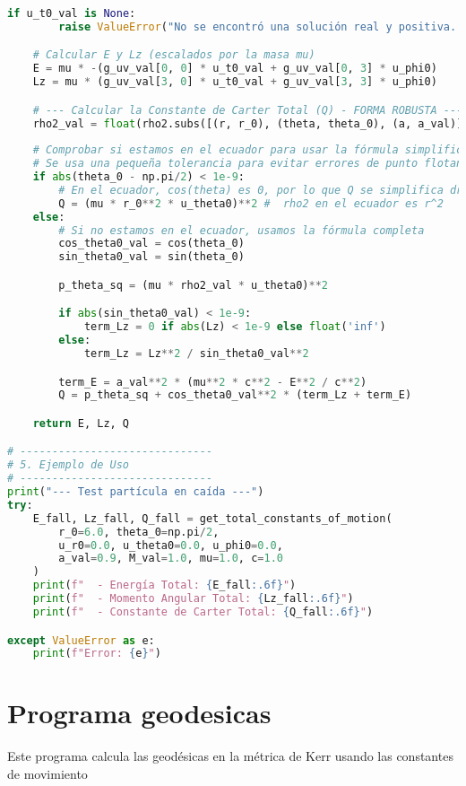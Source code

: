 \begin{lstlisting}[language=Python, caption={Programa para el calculo de las constantes de movimiento en Kerr}]
    if u_t0_val is None:
        raise ValueError("No se encontró una solución real y positiva. Revisa las condiciones iniciales.")

    # Calcular E y Lz (escalados por la masa mu)
    E = mu * -(g_uv_val[0, 0] * u_t0_val + g_uv_val[0, 3] * u_phi0)
    Lz = mu * (g_uv_val[3, 0] * u_t0_val + g_uv_val[3, 3] * u_phi0)

    # --- Calcular la Constante de Carter Total (Q) - FORMA ROBUSTA ---
    rho2_val = float(rho2.subs([(r, r_0), (theta, theta_0), (a, a_val)]))
    
    # Comprobar si estamos en el ecuador para usar la fórmula simplificada
    # Se usa una pequeña tolerancia para evitar errores de punto flotante
    if abs(theta_0 - np.pi/2) < 1e-9:
        # En el ecuador, cos(theta) es 0, por lo que Q se simplifica drásticamente
        Q = (mu * r_0**2 * u_theta0)**2 #  rho2 en el ecuador es r^2
    else:
        # Si no estamos en el ecuador, usamos la fórmula completa
        cos_theta0_val = cos(theta_0)
        sin_theta0_val = sin(theta_0)

        p_theta_sq = (mu * rho2_val * u_theta0)**2

        if abs(sin_theta0_val) < 1e-9:
            term_Lz = 0 if abs(Lz) < 1e-9 else float('inf')
        else:
            term_Lz = Lz**2 / sin_theta0_val**2

        term_E = a_val**2 * (mu**2 * c**2 - E**2 / c**2)
        Q = p_theta_sq + cos_theta0_val**2 * (term_Lz + term_E)

    return E, Lz, Q

# ------------------------------
# 5. Ejemplo de Uso 
# ------------------------------
print("--- Test partícula en caída ---")
try:
    E_fall, Lz_fall, Q_fall = get_total_constants_of_motion(
        r_0=6.0, theta_0=np.pi/2, 
        u_r0=0.0, u_theta0=0.0, u_phi0=0.0,
        a_val=0.9, M_val=1.0, mu=1.0, c=1.0
    )
    print(f"  - Energía Total: {E_fall:.6f}")
    print(f"  - Momento Angular Total: {Lz_fall:.6f}")
    print(f"  - Constante de Carter Total: {Q_fall:.6f}")

except ValueError as e:
    print(f"Error: {e}")

\end{lstlisting}

\section{Programa geodesicas}
\label{chap:programa_geodesicas}
Este programa calcula las geodésicas en la métrica de Kerr usando las constantes de movimiento 

